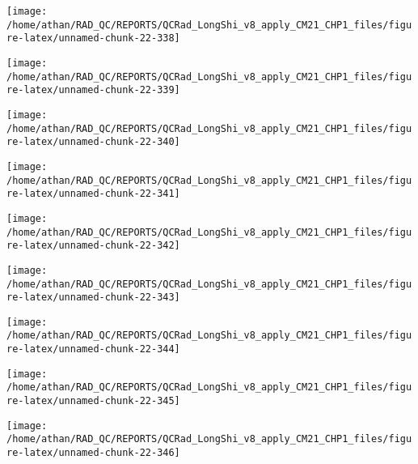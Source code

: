 \documentclass[
  10pt,
  a4paper,oneside]{article}
\begin{document}
\begin{center}\texttt{[image: /home/athan/RAD\_QC/REPORTS/QCRad\_LongShi\_v8\_apply\_CM21\_CHP1\_files/figure-latex/unnamed-chunk-22-338]} \end{center}

\begin{center}\texttt{[image: /home/athan/RAD\_QC/REPORTS/QCRad\_LongShi\_v8\_apply\_CM21\_CHP1\_files/figure-latex/unnamed-chunk-22-339]} \end{center}

\begin{center}\texttt{[image: /home/athan/RAD\_QC/REPORTS/QCRad\_LongShi\_v8\_apply\_CM21\_CHP1\_files/figure-latex/unnamed-chunk-22-340]} \end{center}

\begin{center}\texttt{[image: /home/athan/RAD\_QC/REPORTS/QCRad\_LongShi\_v8\_apply\_CM21\_CHP1\_files/figure-latex/unnamed-chunk-22-341]} \end{center}

\begin{center}\texttt{[image: /home/athan/RAD\_QC/REPORTS/QCRad\_LongShi\_v8\_apply\_CM21\_CHP1\_files/figure-latex/unnamed-chunk-22-342]} \end{center}

\begin{center}\texttt{[image: /home/athan/RAD\_QC/REPORTS/QCRad\_LongShi\_v8\_apply\_CM21\_CHP1\_files/figure-latex/unnamed-chunk-22-343]} \end{center}

\begin{center}\texttt{[image: /home/athan/RAD\_QC/REPORTS/QCRad\_LongShi\_v8\_apply\_CM21\_CHP1\_files/figure-latex/unnamed-chunk-22-344]} \end{center}

\begin{center}\texttt{[image: /home/athan/RAD\_QC/REPORTS/QCRad\_LongShi\_v8\_apply\_CM21\_CHP1\_files/figure-latex/unnamed-chunk-22-345]} \end{center}

\begin{center}\texttt{[image: /home/athan/RAD\_QC/REPORTS/QCRad\_LongShi\_v8\_apply\_CM21\_CHP1\_files/figure-latex/unnamed-chunk-22-346]} \end{center}
\end{document}
